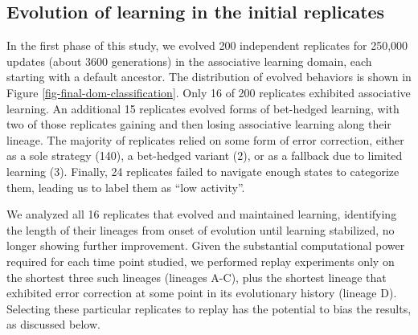 \subsection{Evolution of learning in the initial replicates}
In the first phase of this study, we evolved 200 independent replicates for 250,000 updates (about 3600 generations) in the associative learning domain, each starting with a default ancestor. %
The distribution of evolved behaviors is shown in Figure \ref{fig-final-dom-classification}.
Only 16 of 200 replicates exhibited associative learning.
An additional 15 replicates evolved forms of bet-hedged learning, with two of those replicates gaining and then losing associative learning along their lineage.
The majority of replicates relied on some form of error correction, either as a sole strategy (140), a bet-hedged variant (2), or as a fallback due to limited learning (3). 
Finally, 24 replicates failed to navigate enough states to categorize them, leading us to label them as ``low activity''. 

We analyzed all 16 replicates that evolved and maintained learning, identifying the length of their lineages from onset of evolution until learning stabilized, no longer showing further improvement.
Given the substantial computational power required for each time point studied, we performed replay experiments only on the shortest three such lineages (lineages A-C), plus the shortest lineage that exhibited error correction at some point in its evolutionary history (lineage D).
Selecting these particular replicates to replay has the potential to bias the results, as discussed below.


